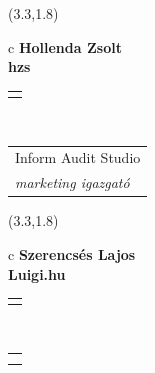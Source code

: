 \documentclass[11pt]{article}
\begin{document}
\makebox(3.3,1.8){
  \renewcommand\arraystretch{1.3}
  \begin{tabular}[c]{c}
    \hspace{8.5mm}
    \LARGE\bf{ Hollenda Zsolt }\\
    \hspace{8.5mm}
    \Large{ hzs }\\
    \renewcommand\arraystretch{3}
    \begin{tabular}[c]{c}
      \centering
      \fontfamily{phv}\selectfont{
        \textbf{
          \textsc{
            \scriptsize{
            \color{Dark}{ Ismerkedő }\color{Dark}{ Webmester }\color{Bright}{ Sminkmester }\color{Bright}{ Programozó }
            }
          }
        }
      }
    \end{tabular}
    \\
    \renewcommand\arraystretch{1}
    \begin{tabular}{p{3.3in}}
      \hspace{.7cm}Inform Audit Studio\\
      \hspace{.7cm}\emph{ marketing igazgató }\\
    \end{tabular}
  \end{tabular}
}

\makebox(3.3,1.8){
  \renewcommand\arraystretch{1.3}
  \begin{tabular}[c]{c}
    \hspace{8.5mm}
    \LARGE\bf{ Szerencsés Lajos }\\
    \hspace{8.5mm}
    \Large{ Luigi.hu }\\
    \renewcommand\arraystretch{3}
    \begin{tabular}[c]{c}
      \centering
      \fontfamily{phv}\selectfont{
        \textbf{
          \textsc{
            \scriptsize{
            \color{Bright}{ Ismerkedő }\color{Dark}{ Webmester }\color{Bright}{ Sminkmester }\color{Bright}{ Programozó }
            }
          }
        }
      }
    \end{tabular}
    \\
    \renewcommand\arraystretch{1}
    \begin{tabular}{p{3.3in}}
      \hspace{.7cm}\\
      \hspace{.7cm}\emph{  }\\
    \end{tabular}
  \end{tabular}
}
\end{document}
